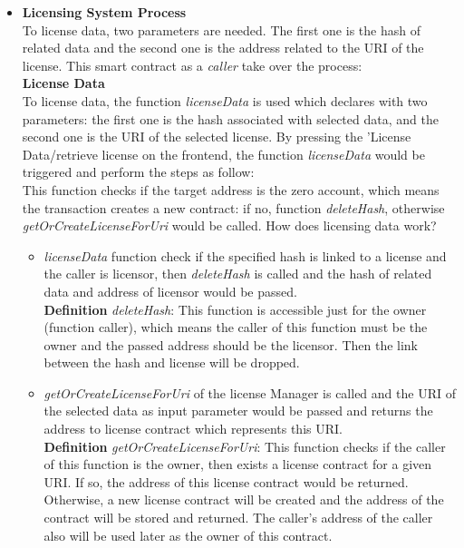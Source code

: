 \begin{itemize}
	\item \textbf{Licensing System Process} \\
	To license data, two parameters are needed. The first one is the hash of related data and the second one is the address related to the URI of the license. This smart contract as a \textit{caller} take over the process: \\
	\textbf{License Data} \\
	To license data, the function \textit{licenseData} is used which declares with two parameters: the first one is the hash associated with selected data, and the second one is the URI of the selected license. By pressing the 'License Data/retrieve license on the frontend, the function
	\textit{licenseData} would be triggered and perform the steps as follow: \\
	This function checks if the target address is the zero account, which means the transaction creates a new contract: 
	if no, function \textit{deleteHash}, otherwise \textit{getOrCreateLicenseForUri} would be called. How does licensing data work? \\
	\begin{itemize}
		\item \textit{licenseData} function check if the specified hash is linked to a license and the caller is licensor, then \textit{deleteHash} is called and the hash of related data and address of licensor would be passed. \\
		\hspace{1cm} \textbf{Definition} \textit{deleteHash}: This function is accessible just for the owner (function caller), which means the caller of this function must be the owner and the passed address should be the licensor. Then the link between the hash and license will be dropped.
		\item \textit{getOrCreateLicenseForUri} of the license Manager is called and the URI of the selected data as input parameter would be passed and returns the address to license contract which represents this URI.\\
		\hspace{1cm} \textbf{Definition} \textit{getOrCreateLicenseForUri}: This function checks if the caller of this function is the owner, then exists a license contract for a given URI. If so, the address of this license contract would be returned. Otherwise, a new license contract will be created and the address of the contract will be stored and returned. The caller's address of the caller also will be used later as the owner of this contract.

\end{itemize}
\end{itemize}
